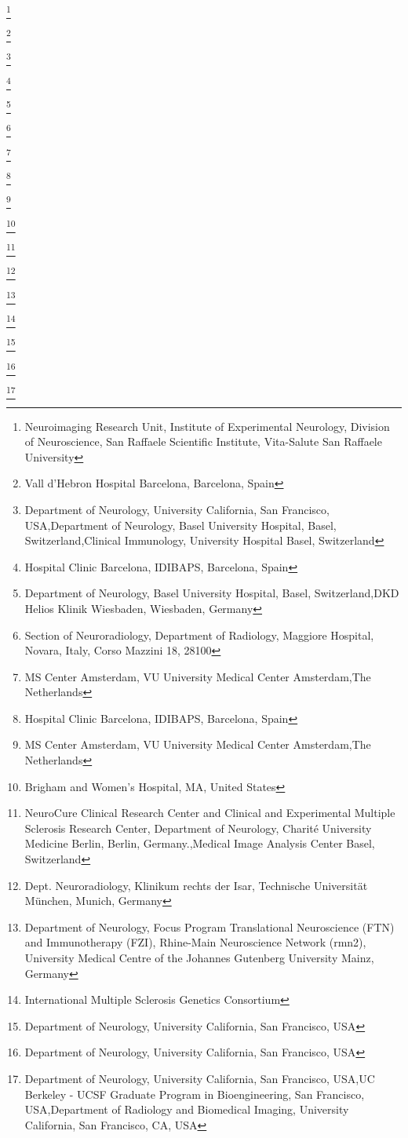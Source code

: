 \author{Maria Rocca}\footnote[14]{Neuroimaging Research Unit, Institute of Experimental Neurology, Division of Neuroscience, San Raffaele Scientific Institute, Vita-Salute San Raffaele University}
\author{Alex Rovira}\footnote[10]{Vall d’Hebron Hospital Barcelona, Barcelona, Spain}
\author{Regina Schlaeger}\footnote[1,6,8]{Department of Neurology, University California, San Francisco,  USA,Department of Neurology, Basel University Hospital, Basel, Switzerland,Clinical Immunology, University Hospital Basel, Switzerland}
\author{Albert Saiz}\footnote[21]{Hospital Clinic Barcelona, IDIBAPS, Barcelona, Spain}
\author{Till Sprenger}\footnote[6,25]{Department of Neurology, Basel University Hospital, Basel, Switzerland,DKD Helios Klinik Wiesbaden, Wiesbaden, Germany}
\author{Alessandro Stecco}\footnote[26]{Section of Neuroradiology, Department of Radiology, Maggiore Hospital, Novara, Italy, Corso Mazzini 18, 28100}
\author{Bernard M.J. Uitdehaag}\footnote[27]{MS Center Amsterdam, VU University Medical Center Amsterdam,The Netherlands}
\author{Pablo Villoslada}\footnote[21]{Hospital Clinic Barcelona, IDIBAPS, Barcelona, Spain}
\author{Mike P. Wattjes}\footnote[27]{MS Center Amsterdam, VU University Medical Center Amsterdam,The Netherlands}
\author{Howard Weiner}\footnote[7]{Brigham and Women's Hospital, MA, United States}
\author{Jens Wuerfel}\footnote[3,28]{NeuroCure Clinical Research Center and Clinical and Experimental Multiple Sclerosis Research Center, Department of Neurology, Charité University Medicine Berlin, Berlin, Germany.,Medical Image Analysis Center Basel, Switzerland}
\author{Claus Zimmer}\footnote[29]{Dept. Neuroradiology, Klinikum rechts der Isar, Technische Universität München, Munich, Germany}
\author{Frauke Zipp}\footnote[17]{Department of Neurology, Focus Program Translational Neuroscience (FTN) and Immunotherapy (FZI), Rhine-Main Neuroscience Network (rmn2), University Medical Centre of the Johannes Gutenberg University Mainz, Germany}
\author{International Multiple Sclerosis Genetics Consortium}\footnote[30]{International Multiple Sclerosis Genetics Consortium}
\author{Stephen Hauser}\footnote[1]{Department of Neurology, University California, San Francisco,  USA}
\author{Jorge R. Oksenberg}\footnote[1]{Department of Neurology, University California, San Francisco,  USA}
\author{Roland G. Henry}\footnote[1,2,11]{Department of Neurology, University California, San Francisco,  USA,UC Berkeley - UCSF Graduate Program in Bioengineering, San Francisco, USA,Department of Radiology and Biomedical Imaging, University California, San Francisco, CA, USA}

